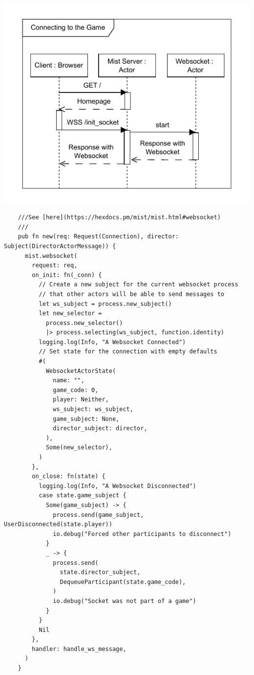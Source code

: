 \documentclass[]{final}
\begin{document}
\begin{minipage}[t]{20em}
  \includegraphics[width=\textwidth]{sequence_connecting}
  \label{fig: 5}
  \vspace*{0.5cm}
  \begin{lstlisting}
    ///See [here](https://hexdocs.pm/mist/mist.html#websocket)
    ///
    pub fn new(req: Request(Connection), director: Subject(DirectorActorMessage)) {
      mist.websocket(
        request: req,
        on_init: fn(_conn) {
          // Create a new subject for the current websocket process
          // that other actors will be able to send messages to
          let ws_subject = process.new_subject()
          let new_selector =
            process.new_selector()
            |> process.selecting(ws_subject, function.identity)
          logging.log(Info, "A Websocket Connected")
          // Set state for the connection with empty defaults
          #(
            WebsocketActorState(
              name: "",
              game_code: 0,
              player: Neither,
              ws_subject: ws_subject,
              game_subject: None,
              director_subject: director,
            ),
            Some(new_selector),
          )
        },
        on_close: fn(state) {
          logging.log(Info, "A Websocket Disconnected")
          case state.game_subject {
            Some(game_subject) -> {
              process.send(game_subject, UserDisconnected(state.player))
              io.debug("Forced other participants to disconnect")
            }
            _ -> {
              process.send(
                state.director_subject,
                DequeueParticipant(state.game_code),
              )
              io.debug("Socket was not part of a game")
            }
          }
          Nil
        },
        handler: handle_ws_message,
      )
    }
  \end{lstlisting}
\end{minipage}
\end{document}
